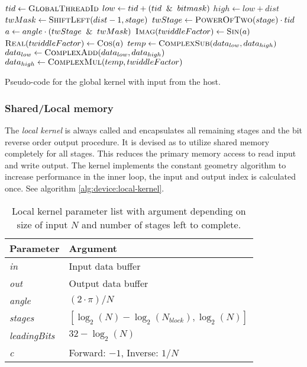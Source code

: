 \begin{algorithm}
	\centering
	\begin{algorithmic}[1]
            \State $tid \gets \Call{GlobalThreadId}{}$ 
            \State $low \gets tid + (tid \And bitmask)$
            \State $high \gets low + dist$
            \State $twMask \gets \Call{ShiftLeft}{dist - 1, stage}$
            \State $twStage \gets \Call{PowerOfTwo}{stage} \cdot tid$
            \State $a \gets angle \cdot (twStage \And twMask)$
            \State $\Call{Imag}{twiddleFactor} \gets \Call{Sin}{a}$
            \State $\Call{Real}{twiddleFactor} \gets \Call{Cos}{a}$
            \State $temp \gets \Call{ComplexSub}{data_{low}, data_{high}}$
            \State $data_{low} \gets \Call{ComplexAdd}{data_{low}, data_{high}}$
            \State $data_{high} \gets \Call{ComplexMul}{temp, twiddleFactor}$
        \EndProcedure
	\end{algorithmic}
	\caption{Pseudo-code for the global kernel with input from the host.}
	\label{alg:device:global-kernel}
\end{algorithm}

\subsubsection{Shared/Local memory}

The \textit{local kernel} is always called and encapsulates all remaining stages and the bit reverse order output procedure. It is devised as to utilize shared memory completely for all stages. This reduces the primary memory access to read input and write output. The kernel implements the constant geometry algorithm to increase performance in the inner loop, the input and output index is calculated once. See algorithm \ref{alg:device:local-kernel}.

\begin{table}
	\centering
	\begin{tabular}{|l|l|}
		\hline
		Parameter & Argument \\ \hline
		\textit{in} & Input data buffer \\ \hline
		\textit{out} & Output data buffer \\ \hline
		\textit{angle} & $(2 \cdot \pi)/N$ \\ \hline
		\textit{stages} & $[\log_{2}(N) - \log_{2}(N_{block}), \log_{2}(N)]$ \\ \hline
		\textit{leadingBits} & $32 - \log_{2}(N)$ \\ \hline
		\textit{c} & Forward: $-1$, Inverse: $1/N$ \\ \hline
	\end{tabular}
	\caption{Local kernel parameter list with argument depending on size of input $N$ and number of stages left to complete.}
	\label{tab:local-kernel}
\end{table}

